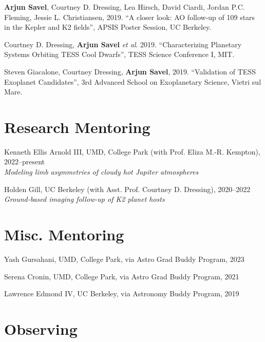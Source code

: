 \documentclass[letterpaper,10.5pt]{article}
\newcommand{\resumeSubHeadingListStart}{\begin{itemize}[leftmargin=*]}
\newcommand{\resumeSubHeadingListEnd}{\end{itemize}}
\newcommand{\shorterSection}[1]{\vspace{-10pt}\section{#1}}
\begin{document}
\begin{list}{}{\cvlist}
  \item[{\color{numcolor}\scriptsize3}] \textbf{Arjun Savel}, Courtney D. Dressing, Lea Hirsch, David Ciardi, Jordan P.C. Fleming, Jessie L. Christiansen, 2019. “A closer look: AO follow-up of 109 stars in the Kepler and K2 fields”, APSIS Poster Session, UC Berkeley.

\item[{\color{numcolor}\scriptsize2}] Courtney D. Dressing, \textbf{Arjun Savel} \textit{et al}. 2019. “Characterizing Planetary Systems Orbiting TESS Cool Dwarfs”, TESS Science Conference I, MIT.

\item[{\color{numcolor}\scriptsize1}] Steven Giacalone, Courtney Dressing, \textbf{Arjun Savel}, 2019. “Validation of TESS Exoplanet Candidates”, 3rd Advanced School on Exoplanetary Science, Vietri sul Mare.

  \end{list}

\shorterSection{Research Mentoring}
\small
  \begin{list}{}{\cvlist}  
  \item[{\color{numcolor}}]Kenneth Ellis Arnold III, UMD, College Park (with Prof. Eliza M.-R. Kempton), 2022--present \\
  \textit{Modeling limb asymmetries of cloudy hot Jupiter atmospheres}
  \item[{\color{numcolor}}]Holden Gill, UC Berkeley (with Asst. Prof. Courtney D. Dressing), 2020--2022 \\
    \textit{Ground-based imaging follow-up of K2 planet hosts}


  \end{list}

\shorterSection{Misc. Mentoring}
\small
  \begin{list}{}{\cvlist}
  \item[{\color{numcolor}}]Yash Gursahani, UMD, College Park, via Astro Grad Buddy Program, 2023
  \item[{\color{numcolor}}]Serena Cronin, UMD, College Park, via Astro Grad Buddy Program, 2021 
  \item[{\color{numcolor}}]Lawrence Edmond IV, UC Berkeley, via Astronomy Buddy Program, 2019


  \end{list} 



\shorterSection{Observing}
\end{document}

